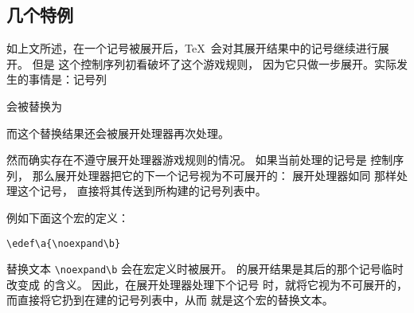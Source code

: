 \documentclass{book}
\begin{document}
\subsection{几个特例}

如上文所述，在一个记号被展开后，\TeX\ 会对其展开结果中的记号继续进行展开。
但是  这个控制序列初看破坏了这个游戏规则，
因为它只做一步展开。实际发生的事情是：记号列
\begin{disp}\end{disp}
会被替换为
\begin{disp}\end{disp}
而这个替换结果还会被展开处理器再次处理。

然而确实存在不遵守展开处理器游戏规则的情况。
如果当前处理的记号是  控制序列，
那么展开处理器把它的下一个记号视为不可展开的：
展开处理器如同  那样处理这个记号，
直接将其传送到所构建的记号列表中。

例如下面这个宏的定义：
\begin{verbatim}
\edef\a{\noexpand\b}
\end{verbatim}
替换文本 \verb>\noexpand\b> 会在宏定义时被展开。
 的展开结果是其后的那个记号临时改变成  的含义。
因此，在展开处理器处理下个记号  时，就将它视为不可展开的，
而直接将它扔到在建的记号列表中，从而  就是这个宏的替换文本。
\end{document}
